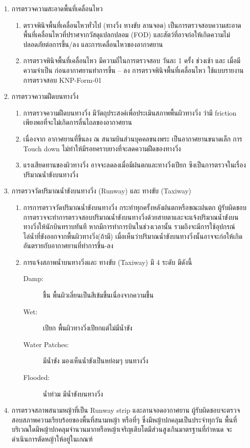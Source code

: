 \begin{enumerate}
\item การตรวจความสะอาดพื้นที่เคลื่อนไหว %
	\begin{enumerate}
		\item ตรวจพินิจพื้นที่เคลื่อนไหวทั่วไป (ทางวิ่ง ทางขับ ลานจอด) เป็นการตรวจสอบความสะอาดพื้นที่เคลื่อนไหวที่ปราศจากวัสดุแปลกปลอม (FOD) และสัตว์ที่อาจก่อให้เกิดความไม่ปลอดภัยต่อการขึ้น/ลง และการเคลื่อนไหวของอากาศยาน
		\item การตรวจพินิจพื้นที่เคลื่อนไหว มีความถี่ในการตรวจสอบ วันละ 1 ครั้ง ช่วงเช้า และ เมื่อมีความจำเป็น ก่อนอากาศยานทำการขึ้น – ลง การตรวจพินิจพื้นที่เคลื่อนไหว ใช้แบบรายงานการตรวจสอบ KNP-Form-01
	\end{enumerate}

\item การตรวจความฝืดบนทางวิ่ง %
	\begin{enumerate}
		\item การตรวจความฝืดบนทางวิ่ง มีวัตถุประสงค์เพื่อประเมินสภาพพื้นผิวทางวิ่ง ว่ามี friction เพียงพอที่จะไม่เกิดการลื่นไถลของอากาศยาน
		\item เนื่องจาก อากาศยานที่ขึ้นลง ณ สนามบินส่วนบุคคลขนงพระ เป็นอากาศยานขนาดเล็ก การ Touch down ไม่ทำให้มีรอยคราบยางที่จะลดความฝืดของทางวิ่ง
		\item แรงเสียดทานของผิวทางวิ่ง อาจจะลดลงเมื่อมีฝนตกและทางวิ่งเปียก  ซึงเป็นการตรวจในเรื่องปริมาณน้ำขังบนทางวิ่ง
	\end{enumerate}

\item การตรวจวัดปริมาณน้ำขังบนทางวิ่ง (Runway) และ ทางขับ (Taxiway) %
	\begin{enumerate}
		\item การการตรวจวัดปริมาณน้ำขังบนทางวิ่ง กระทำทุกครั้งหลังฝนตกหรือขณะฝนตก  ผู้รับผิดชอบการตรวจจะทำการตรวจสอบปริมาณน้ำขังบนทางวิ่งด้วยสายตาและจะแจ้งปริมาณน้ำขังบนทางวิ่งให้นักบินทราบทันที หากมีการทำการบินในช่วงเวลานั้น รวมถึงจะมีการใช้อุปกรณ์ไล่น้ำที่ขังออกจากพื้นผิวทางวิ่ง(ถ้ามี) เมื่อเห็นว่าปริมาณน้ำขังบนทางวิ่งนั้นอาจจะก่อให้เกิดอันตรายกับอากาศยานที่ทำการขึ้น-ลง 
		\item การแจ้งสภาพน้ำบนทางวิ่งและ ทางขับ (Taxiway) มี 4 ระดับ มีดังนี้
			\begin{description}
				\item[Damp:] ชื้น พื้นผิวเลี่ยนเป็นสีเข้มขึ้นเนื่องจากความชื้น
				\item[Wet:] เปียก พื้นผิวทางวิ่งเปียกแต่ไม่มีน้ำขัง
				\item[Water Patches:] มีน้ำขัง มองเห็นน้ำขังเป็นหย่อมๆ บนทางวิ่ง
				\item[Flooded:] น้ำท่วม มีน้ำขังบนทางวิ่ง
			\end{description}
	\end{enumerate}

\item การตรวจสภาพสนามหญ้าที่เป็น Runway strip และลานจอดอากาศยาน %
	ผู้รับผิดชอบจะตรวจสอบสภาพความเรียบร้อยของพื้นที่สนามหญ้า หรือที่ๆ ซึ่งมีหญ้าปกคลุมเป็นประจำทุกวัน พื้นที่บริเวณใดมีหญ้าปกคลุมจำนวนมากหรือหญ้าเจริญเติบโตมีส่วนสูงเกินมาตรฐานที่กำหนด จะดำเนินการตัดหญ้าให้อยู่ในเกณฑ์
\end{enumerate}

